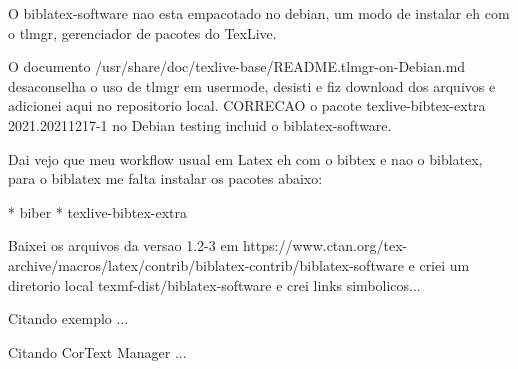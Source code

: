 \documentclass{article}
\begin{document}
O biblatex-software nao esta empacotado no debian, um modo de instalar eh com o tlmgr, gerenciador
de pacotes do TexLive.


O documento /usr/share/doc/texlive-base/README.tlmgr-on-Debian.md desaconselha o uso de tlmgr em usermode, desisti e fiz download
dos arquivos e adicionei aqui no repositorio local. CORRECAO o pacote texlive-bibtex-extra 2021.20211217-1 no Debian testing incluid o biblatex-software.

Dai vejo que meu workflow usual em Latex eh com o bibtex e nao o biblatex, para o biblatex me falta instalar os pacotes abaixo:

* biber
* texlive-bibtex-extra

Baixei os arquivos da versao 1.2-3 em https://www.ctan.org/tex-archive/macros/latex/contrib/biblatex-contrib/biblatex-software
e criei um diretorio local texmf-dist/biblatex-software e crei links simbolicos...


Citando exemplo \cite{delebecque:hal-02090402} ...

Citando CorText Manager \cite{cortext_manager_v2} ...

\printbibliography
\end{document}

